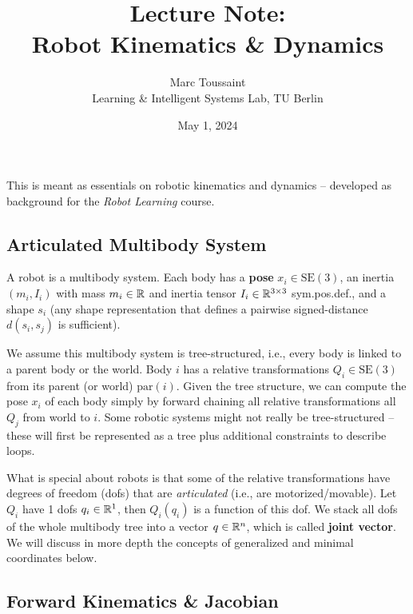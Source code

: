 
\note

\title{Lecture Note:\\ Robot Kinematics \& Dynamics}
\author{Marc Toussaint\\\small Learning \& Intelligent Systems Lab, TU Berlin}
\date{May 1, 2024}

\makeatletter
\renewcommand{\@seccntformat}[1]{}
\makeatother

\newcommand{\pa}{\text{par}}
\newcommand{\SO}{\text{SO}}
\newcommand{\SE}{\text{SE}}
\newcommand{\se}{\text{se}}
\newcommand{\ang}{\text{ang}}

\notetitle


This is meant as essentials on robotic kinematics and
dynamics -- developed as background for the \emph{Robot Learning} course.

\subsection{Articulated Multibody System}

A robot is a multibody
system. Each body has a \textbf{pose} $x_i\in\SE(3)$, an inertia $(m_i, I_i)$
with mass $m_i\in{\mathbb{R}}$ and inertia tensor $I_i \in {\mathbb{R}}^{3\times 3}$
sym.pos.def., and a shape $s_i$ (any shape representation that defines
a pairwise signed-distance $d(s_i, s_j)$ is sufficient).

We assume this multibody system is tree-structured, i.e., every body
is linked to a parent body or the world. Body $i$ has a relative
transformations $Q_i \in \SE(3)$ from its parent (or world)
$\pa(i)$.  Given the tree
structure, we can compute the pose $x_i$ of each body simply by
forward chaining all relative transformations all $Q_j$ from world to
$i$. Some robotic systems might not really be tree-structured --
these will first be represented as a tree
plus additional constraints to describe loops.

What is special about robots is that some of the relative
transformations have degrees of freedom (dofs) that are
\emph{articulated} (i.e., are motorized/movable). Let $Q_i$ have 1
dofs $q_i \in {\mathbb{R}}^1$, then $Q_i(q_i)$ is a function of this dof. We
stack all dofs of the whole multibody tree into a vector $q\in{\mathbb{R}}^n$,
which is called \textbf{joint vector}. We will discuss in more depth
the concepts of generalized and minimal coordinates below.


\subsection{Forward Kinematics \& Jacobian}

